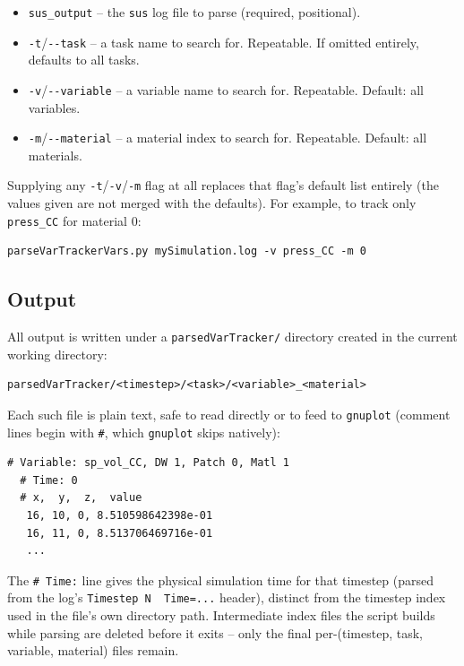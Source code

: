\begin{itemize}
  \item \verb|sus_output| -- the \verb|sus| log file to parse (required,
    positional).
  \item \verb|-t|/\verb|--task| -- a task name to search for. Repeatable.
    If omitted entirely, defaults to all tasks.
  \item \verb|-v|/\verb|--variable| -- a variable name to search for.
    Repeatable. Default: all variables.
  \item \verb|-m|/\verb|--material| -- a material index to search for.
    Repeatable. Default: all materials.
\end{itemize}

\noindent Supplying any \verb|-t|/\verb|-v|/\verb|-m| flag at all replaces that
flag's default list entirely (the values given are not merged with the
defaults). For example, to track only \verb|press_CC| for material 0:

\begin{Verbatim}[fontsize=\footnotesize]
  parseVarTrackerVars.py mySimulation.log -v press_CC -m 0
\end{Verbatim}

\subsection{Output}
All output is written under a \verb|parsedVarTracker/| directory created
in the current working directory:

\begin{Verbatim}[fontsize=\footnotesize]
  parsedVarTracker/<timestep>/<task>/<variable>_<material>
\end{Verbatim}

\noindent Each such file is plain text, safe to read directly or to feed to
\verb|gnuplot| (comment lines begin with \verb|#|, which \verb|gnuplot|
skips natively):

\begin{Verbatim}[fontsize=\footnotesize]
  # Variable: sp_vol_CC, DW 1, Patch 0, Matl 1
  # Time: 0
  # x,  y,  z,  value
   16, 10, 0, 8.510598642398e-01
   16, 11, 0, 8.513706469716e-01
   ...
\end{Verbatim}

\noindent The \verb|# Time:| line gives the physical simulation time for that
timestep (parsed from the log's \verb|Timestep N  Time=...| header),
distinct from the timestep index used in the file's own directory path.
Intermediate index files the script builds while parsing are deleted
before it exits -- only the final per-(timestep, task, variable, material)
files remain.

